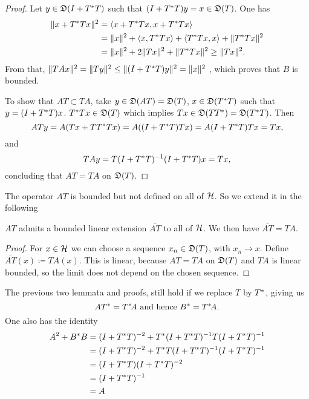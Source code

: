 \begin{proof}
 Let $y \in \mathfrak{D}(I + T ^{*} T)$ such that $(I + T ^{*} T)y = x \in \mathfrak{D}(T)$.
 One has 
 \begin{align*}
   \|x + T ^{*} T x\|^2 &= \left\langle x + T ^{*} T x, x + T ^{*} T x \right\rangle\\
   &= \|x\|^2 +  \left\langle x, T ^{*} Tx \right\rangle + \left\langle T ^{*} Tx, x \right\rangle+ \|T ^{*} Tx\|^2\\
   &= \|x\|^2 + 2\|Tx\|^2 + \|T ^{*} Tx\|^2 \geq \|Tx\|^2.
 \end{align*}
From that, $\| TAx\|^2 = \| Ty \| ^2 \leq \| (I + T ^{*} T)y \|^2 = \| x \| ^2$
, which proves that $B$ is bounded. 

To show that $AT \subset TA$, take $y \in \mathfrak{D}(AT) = \mathfrak{D}(T)$,
$x \in \mathfrak{D}(T ^{*} T)$ such that $y = ( I +  T ^{*} T)x$. $T ^{*} T x \in \mathfrak{D}(T)$
which implies $Tx \in \mathfrak{D}(TT^{*}) = \mathfrak{D}(T^{*} T)$. Then 
\[
 ATy = A(Tx + T T^{*} T x) = A((I + T^{*} T)Tx)= A(I+ T^{*} T)Tx= Tx,
\]
and
\[
 TAy= T(I+ T^{*} T)^{-1} (I + T ^{*} T)x=Tx,
\]
concluding that $AT = TA$ on $\mathfrak{D}(T)$.

\end{proof}

The operator $AT$ is bounded but not defined on all of $\mathcal{H}$. So we extend it
in the following

\begin{lem}
 $AT$ admits a bounded linear extension $\overline{AT}$ to all of $\mathcal{H}$. 
 We then have $\overline{AT}=TA$.
\end{lem}

\begin{proof}
 For $x \in \mathcal{H}$ we can choose a sequence $x_n \in \mathfrak{D}(T)$, with 
 $x_n \rightarrow x$. Define $\overline{AT}(x) \coloneqq TA(x)$.
 This is linear, because $AT = TA$ on $\mathfrak{D}(T)$ and $TA$ is linear bounded,
 so the limit does not depend on the chosen sequence.
\end{proof}

\begin{rem}
 The previous two lemmata and proofs, still hold if we replace $T$ by $T^{*}$,
 giving us 
 \[
  AT^{*} = T^{*} \! A \text{ and hence } B^{*} = T^{*} \! A.
 \]
 One also has the identity
 \begin{align*}
  A^2 + B^{*} B &= (I + T^{*} T)^{-2} + T ^{*} (I + T^{*} T)
		    ^{-1} T (I + T^{*} T) ^{-1} \\
		&= (I + T^{*} T)^{-2} + T ^{*} T(I + T^{*} T)
		   ^{-1} (I + T^{*} T) ^{-1} \\
		&= (I + T^{*} T)(I + T^{*} T)^{-2} \\
		&= (I + T^{*} T)^{-1}  \\
		&= A 
  \end{align*}

  

\end{rem}

